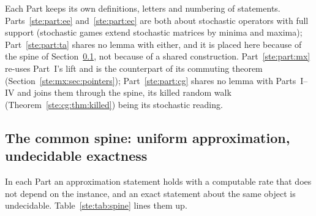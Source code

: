 \documentclass[11pt,letterpaper]{article}
\theoremstyle{definition}
\theoremstyle{remark}
\begin{document}
Each Part keeps its own definitions, letters and numbering of statements. Parts~\ref{ste:part:ee} and~\ref{ste:part:ec} are both about stochastic operators with full support (stochastic games extend stochastic matrices by minima and maxima); Part~\ref{ste:part:ta} shares no lemma with either, and it is placed here because of the spine of Section~\ref{ste:sec:spine}, not because of a shared construction. Part~\ref{ste:part:mx} re-uses Part~I's lift and is the counterpart of its commuting theorem (Section~\ref{ste:mx:sec:pointers}); Part~\ref{ste:part:cg} shares no lemma with Parts~I--IV and joins them through the spine, its killed random walk (Theorem~\ref{ste:cg:thm:killed}) being its stochastic reading.

\subsection{The common spine: uniform approximation, undecidable exactness}\label{ste:sec:spine}

In each Part an approximation statement holds with a computable rate that does not depend on the instance, and an exact statement about the same object is undecidable. Table~\ref{ste:tab:spine} lines them up.
\end{document}
